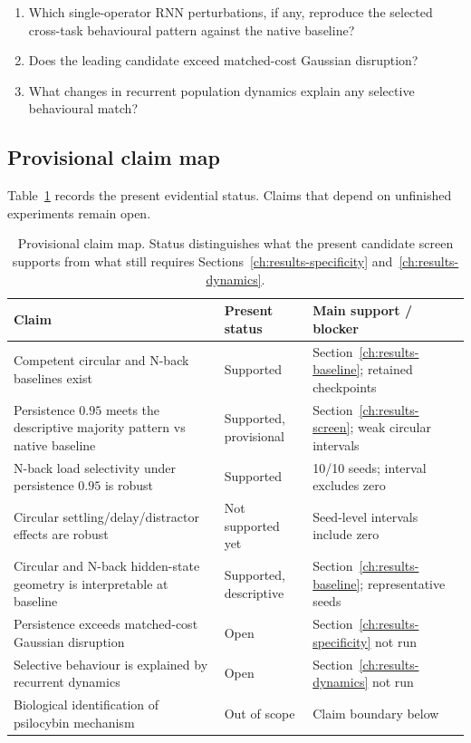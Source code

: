 \begin{enumerate}[leftmargin=*]
  \item Which single-operator RNN perturbations, if any, reproduce the selected
        cross-task behavioural pattern against the native baseline?
  \item Does the leading candidate exceed matched-cost Gaussian disruption?
  \item What changes in recurrent population dynamics explain any selective
        behavioural match?
\end{enumerate}

\subsection{Provisional claim map}

Table~\ref{tab:claim-map} records the present evidential status. Claims that
depend on unfinished experiments remain open.

\begin{table}[t]
\caption{Provisional claim map. Status distinguishes what the present
candidate screen supports from what still requires Sections~\ref{ch:results-specificity}
and~\ref{ch:results-dynamics}.}
\label{tab:claim-map}
\begin{tabular}{p{}p{}p{}}
\toprule
Claim & Present status & Main support / blocker \\
\midrule
Competent circular and N-back baselines exist
& Supported
& Section~\ref{ch:results-baseline}; retained checkpoints \\
Persistence $0.95$ meets the descriptive majority pattern vs native baseline
& Supported, provisional
& Section~\ref{ch:results-screen}; weak circular intervals \\
N-back load selectivity under persistence $0.95$ is robust
& Supported
& 10/10 seeds; interval excludes zero \\
Circular settling/delay/distractor effects are robust
& Not supported yet
& Seed-level intervals include zero \\
Circular and N-back hidden-state geometry is interpretable at baseline
& Supported, descriptive
& Section~\ref{ch:results-baseline}; representative seeds \\
Persistence exceeds matched-cost Gaussian disruption
& Open
& Section~\ref{ch:results-specificity} not run \\
Selective behaviour is explained by recurrent dynamics
& Open
& Section~\ref{ch:results-dynamics} not run \\
Biological identification of psilocybin mechanism
& Out of scope
& Claim boundary below \\
\bottomrule
\end{tabular}
\end{table}

